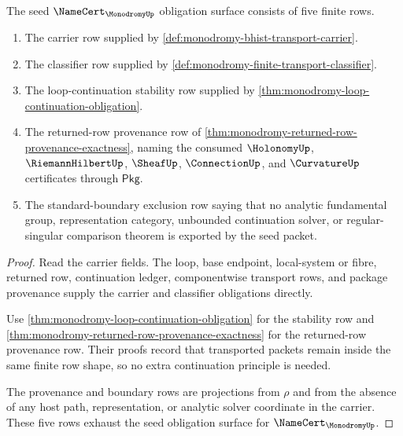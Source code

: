 \begin{theorem}
\label{thm:monodromy-namecert-obligation-surface}
The seed $\NameCert_{\MonodromyUp}$ obligation surface consists of five finite rows.
\begin{enumerate}
\item The carrier row supplied by \autoref{def:monodromy-bhist-transport-carrier}.
\item The classifier row supplied by \autoref{def:monodromy-finite-transport-classifier}.
\item The loop-continuation stability row supplied by \autoref{thm:monodromy-loop-continuation-obligation}.
\item The returned-row provenance row of \autoref{thm:monodromy-returned-row-provenance-exactness}, naming the consumed $\HolonomyUp$, $\RiemannHilbertUp$, $\SheafUp$, $\ConnectionUp$, and $\CurvatureUp$ certificates through $\mathsf{Pkg}$.
\item The standard-boundary exclusion row saying that no analytic fundamental group, representation category, unbounded continuation solver, or regular-singular comparison theorem is exported by the seed packet.
\end{enumerate}
\end{theorem}
\begin{proof}
Read the carrier fields. The loop, base endpoint, local-system or fibre, returned row, continuation ledger, componentwise transport rows, and package provenance supply the carrier and classifier obligations directly.

Use \autoref{thm:monodromy-loop-continuation-obligation} for the stability row and \autoref{thm:monodromy-returned-row-provenance-exactness} for the returned-row provenance row. Their proofs record that transported packets remain inside the same finite row shape, so no extra continuation principle is needed.

The provenance and boundary rows are projections from $\rho$ and from the absence of any host path, representation, or analytic solver coordinate in the carrier. These five rows exhaust the seed obligation surface for $\NameCert_{\MonodromyUp}$.
\end{proof}

